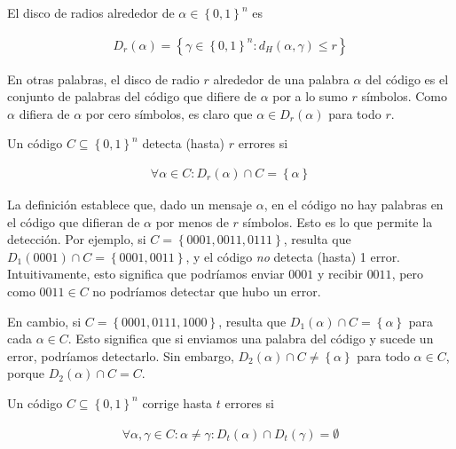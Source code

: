 \documentclass[a4paper]{article}
\begin{document}
\begin{definition}[Disco]
    El disco de radios alrededor de $\alpha \in \left\{ 0, 1 \right\}^n $ es 

    \begin{align*}
        D_r(\alpha) = \left\{ \gamma \in \left\{ 0, 1 \right\}^n : d_H(\alpha, \gamma) \leq r  \right\} 
    \end{align*}
\end{definition}

En otras palabras, el disco de radio $r$ alrededor de una palabra $\alpha$ del
código es el conjunto de palabras del código que difiere de $\alpha$ por a lo
sumo $r$ símbolos. Como $\alpha$ difiera de $\alpha$ por cero símbolos, es
claro que $\alpha \in D_r(\alpha)$ para todo $r$.

\begin{definition}[Detección]
    Un código $C \subseteq \left\{ 0, 1 \right\}^n $ detecta (hasta) $r$ errores si 

    \begin{align*}
        \forall \alpha \in C : D_r(\alpha) \cap C = \left\{ \alpha \right\} 
    \end{align*}
\end{definition}

La definición establece que, dado un mensaje $\alpha$, en el código no hay
palabras en el código que difieran de $\alpha$ por menos de $r$ símbolos. Esto
es lo que permite la detección. Por ejemplo, si $C = \left\{ 0001, 0011, 0111
\right\} $, resulta que $D_1(0001) \cap C = \left\{ 0001, 0011 \right\} $, y el
código \textit{no} detecta (hasta) 1 error. Intuitivamente, esto significa que
podríamos enviar $0001$ y recibir $0011$, pero como $0011 \in C$ no podríamos
detectar que hubo un error.

En cambio, si $C = \left\{ 0001, 0111, 1000 \right\} $, resulta que
$D_1(\alpha) \cap C = \left\{ \alpha \right\} $ para cada $\alpha \in C$. Esto
significa que si enviamos una palabra del código y sucede un error, podríamos
detectarlo. Sin embargo, $D_2(\alpha) \cap C \neq \left\{ \alpha \right\} $
para todo $\alpha \in C$, porque $D_2(\alpha) \cap C = C$.


\begin{definition}[Corrección]
    Un código $C \subseteq \left\{ 0, 1 \right\}^{n} $ corrige hasta $t$ errores si 

    \begin{align*}
        \forall \alpha, \gamma \in C : \alpha \neq \gamma : D_t(\alpha) \cap D_t(\gamma) = \emptyset
    \end{align*}
\end{definition}
\end{document}
